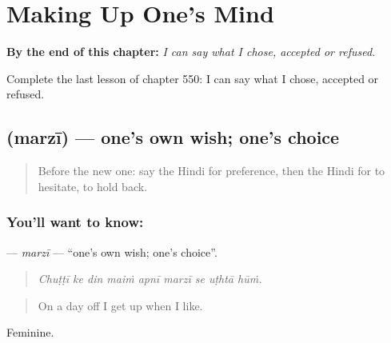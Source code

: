 
\chapter{Making Up One's Mind}
\label{ch:hi-making-up-one-s-mind}

\begin{chapteropening}
\textbf{By the end of this chapter:} \emph{I can say what I chose, accepted or refused.}

Complete the last lesson of chapter 550: I can say what I chose, accepted or refused.
\end{chapteropening}

\section[\texorpdfstring{\hi{मर्ज़ी} (marzī)}{मर्ज़ी (marzī)}]{ (marzī) — one's own wish; one's choice}

\label{lesson:HI-C550-marzi}



\begin{quote}
Before the new one: say the Hindi for preference, then the Hindi for to hesitate, to hold back.
\end{quote}

\subsection*{You'll want to know: }
\textbf{} — \emph{marzī} — \textquotedblleft{}one's own wish; one's choice\textquotedblright{}.

\begin{quote}
        
\end{quote}

\begin{quote}
\emph{Chuṭṭī ke din maiṁ apnī marzī se uṭhtā hūṁ.}
\end{quote}

\begin{quote}
On a day off I get up when I like.
\end{quote}

Feminine.

